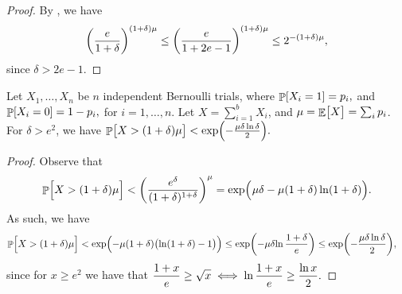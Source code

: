 \begin{proof}
    By , we have
    \begin{align*}
      \pth{\frac{e}{1+\delta}}^{(1+\delta)\mu}%
      \leq%
      \pth{\frac{e}{1+2e - 1}}^{(1+\delta)\mu}%
      \leq%
      2^{-(1+\delta)\mu},
    \end{align*}
    since $\delta > 2e - 1$.
\end{proof}

\begin{lemma}
    Let $X_1, \ldots, X_n$ be $n$ independent Bernoulli trials, where
    \begin{math}
        \Prob{  X_i = 1 } =p_i,
    \end{math}
    and
    \begin{math}
        \Prob{  X_i = 0 } =1- p_i,
    \end{math}
    for $i=1,\ldots, n$.  Let $X = \sum_{i=1}^{b} X_i$, and
    $\mu = \mathop{\mathbb{E}}\!\left[ {\bigl. X} \right] = \sum_i p_i$.  For $\delta > e^2$, we have
    \begin{math}
        \Prob{ \bigl. X > (1+\delta)\mu }%
        <%
        \exp \pth{ \Bigl. - \frac{\mu \delta \ln \delta}{2}}.%
    \end{math}
\end{lemma}
\begin{proof}
    Observe that
    \begin{align}
        \Prob{\Bigl. X > (1+\delta)\mu }%
        <%
        \pth{ \frac{e^\delta}{(1+\delta)^{1+\delta}}}^\mu%
        =%
        \exp \pth{ \Bigl.\ts \mu \delta - \mu\pth{1+\delta}\ln \pth{
              1+\delta}}.%
        \eqlab{c:imply}%
    \end{align}
    As such, we have
    \begin{align*}
        \Prob{\Bigl. X > (1+\delta)\mu }%
        &<%
        \exp \pth{ \Bigl. - \mu\pth{1+\delta} \pth{ \bigl. \ln \pth{
                 1+\delta} - 1 }}%
        \leq %
        \exp \pth{ \Bigl. - \mu \delta { \bigl. \ln {
                 \frac{1+\delta}{e}} }}%
        \leq %
        \exp \pth{ \Bigl. - \frac{\mu \delta \ln \delta}{2}},
    \end{align*}
    since for $x \geq e^2$ we have that
    \begin{math}
        \ds%
        \frac{1+x}{e} \geq \sqrt{x} \iff%
        \ln \frac{1+x}{e} \geq \frac{\ln{x}}{2}.
    \end{math}
\end{proof}


